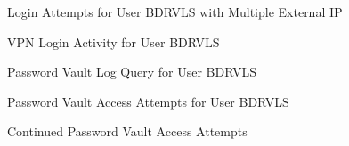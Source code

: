 \documentclass[11pt]{article}
\begin{document}
	\begin{figure}[h]
		\centering
		\caption{Login Attempts for User BDRVLS with Multiple External IP}
		\label{fig: A10}
	\end{figure}
	
	\begin{figure}[h]
		\centering
		\caption{VPN Login Activity for User BDRVLS}
		\label{fig: A11}
	\end{figure}
	
	\begin{figure}[h]
		\centering
		\caption{Password Vault Log Query for User BDRVLS}
		\label{fig: A12}
	\end{figure}
	
	\begin{figure}[h]
		\centering
		\caption{Password Vault Access Attempts for User BDRVLS}
		\label{fig: A13}
	\end{figure}
	
	\begin{figure}[h]
		\centering
		\caption{Continued Password Vault Access Attempts}
		\label{fig: A14}
	\end{figure}
	
\end{document}
